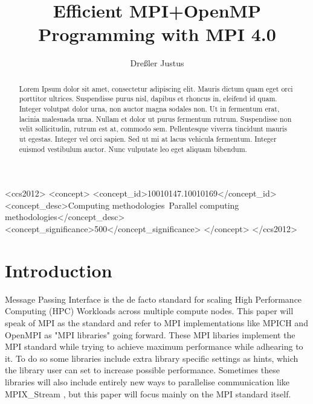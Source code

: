 \documentclass[sigconf]{acmart}
\begin{document}
\title{Efficient MPI+OpenMP Programming with MPI 4.0}
\author{Dreßler Justus}


\begin{CCSXML}
    <ccs2012>
    <concept>
    <concept_id>10010147.10010169</concept_id>
    <concept_desc>Computing methodologies~Parallel computing methodologies</concept_desc>
    <concept_significance>500</concept_significance>
    </concept>
    </ccs2012>
\end{CCSXML}


\begin{abstract}

    Lorem Ipsum dolor sit amet, consectetur adipiscing elit.
    Mauris dictum quam eget orci porttitor ultrices.
    Suspendisse purus nisl, dapibus et rhoncus in, eleifend id quam. Integer volutpat dolor urna, non auctor magna sodales non.
    Ut in fermentum erat, lacinia malesuada urna.
    Nullam et dolor ut purus fermentum rutrum.
    Suspendisse non velit sollicitudin, rutrum est at, commodo sem. Pellentesque viverra tincidunt mauris ut egestas.
    Integer vel orci sapien. Sed ut mi at lacus vehicula fermentum.
    Integer euismod vestibulum auctor.
    Nunc vulputate leo eget aliquam bibendum.

\end{abstract}

\maketitle

\section{Introduction}

Message Passing Interface is the de facto standard for scaling High Performance Computing (HPC) Workloads across multiple compute nodes.
This paper will speak of MPI as the standard and refer to MPI implementations like MPICH and OpenMPI as "MPI libraries" going forward.
These MPI libaries implement the MPI standard while trying to achieve maximum performance while adhearing to it.
To do so some libraries include extra library specific settings as hints, which the library user can set to increase possible performance.
Sometimes these libraries will also include entirely new ways to parallelise communication like MPIX\_Stream \cite{Zhou2022}, but this paper will focus mainly on the MPI standard itself.
\end{document}
